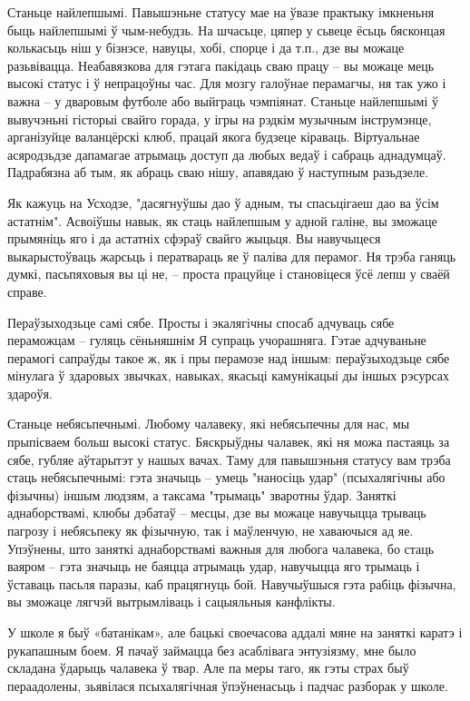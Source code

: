 Станьце найлепшымі. Павышэньне статусу мае на ўвазе практыку імкненьня быць найлепшымі ў чым-небудзь. На шчасьце, цяпер у сьвеце ёсьць бясконцая колькасьць ніш у бізнэсе, навуцы, хобі, спорце і да т.п., дзе вы можаце разьвівацца. Неабавязкова для гэтага пакідаць сваю працу – вы можаце мець высокі статус і ў непрацоўны час. Для мозгу галоўнае перамагчы, ня так ужо і важна – у дваровым футболе або выйграць чэмпіянат. Станьце найлепшымі ў вывучэньні гісторыі свайго горада, у ігры на рэдкім музычным інструмэнце, арганізуйце валанцёрскі клюб, працай якога будзеце кіраваць. Віртуальнае асяродзьдзе дапамагае атрымаць доступ да любых ведаў і сабраць аднадумцаў. Падрабязна аб тым, як абраць сваю нішу, апавядаю ў наступным разьдзеле.

Як кажуць на Усходзе, "дасягнуўшы дао ў адным, ты спасьцігаеш дао ва ўсім астатнім". Асвоіўшы навык, як стаць найлепшым у адной галіне, вы зможаце прымяніць яго і да астатніх сфэраў свайго жыцьця. Вы навучыцеся выкарыстоўваць жарсьць і ператвараць яе ў паліва для перамог. Ня трэба ганяць думкі, пасьпяховыя вы ці не, – проста працуйце і становіцеся ўсё лепш у сваёй справе.

Пераўзыходзьце самі сябе. Просты і экалягічны спосаб адчуваць сябе пераможцам – гуляць сёньняшнім Я супраць учорашняга. Гэтае адчуваньне перамогі сапраўды такое ж, як і пры перамозе над іншым: пераўзыходзьце сябе мінулага ў здаровых звычках, навыках, якасьці камунікацыі ды іншых рэсурсах здароўя.

Станьце небясьпечнымі. Любому чалавеку, які небясьпечны для нас, мы прыпісваем больш высокі статус. Бяскрыўдны чалавек, які ня можа пастаяць за сябе, губляе аўтарытэт у нашых вачах. Таму для павышэньня статусу вам трэба стаць небясьпечнымі: гэта значыць – умець "наносіць удар" (псыхалягічны або фізычны) іншым людзям, а таксама "трымаць" зваротны ўдар. Заняткі аднаборствамі, клюбы дэбатаў – месцы, дзе вы можаце навучыцца трываць пагрозу і небясьпеку як фізычную, так і маўленчую, не хаваючыся ад яе. Упэўнены, што заняткі аднаборствамі важныя для любога чалавека, бо стаць ваяром – гэта значыць не баяцца атрымаць удар, навучыцца яго трымаць і ўставаць пасьля паразы, каб працягнуць бой. Навучыўшыся гэта рабіць фізычна, вы зможаце лягчэй вытрымліваць і сацыяльныя канфлікты.

У школе я быў «батанікам», але бацькі своечасова аддалі мяне на заняткі каратэ і рукапашным боем. Я пачаў займацца без асаблівага энтузіязму, мне было складана ўдарыць чалавека ў твар. Але па меры таго, як гэты страх быў пераадолены, зьявілася псыхалягічная ўпэўненасьць і падчас разборак у школе.

